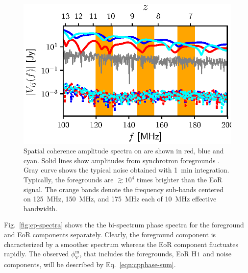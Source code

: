 \documentclass[
reprint,
superscriptaddress,
amsmath,
amssymb,
aps,
prd
]{revtex4-1}
\newcommand{\HI}{H\,{\sc i}}
\begin{document}
\begin{figure}[htb]
\includegraphics[width=\linewidth]{visamp_spectra_asm_eor_noise}
\caption{Spatial coherence amplitude spectra on  are shown in red, blue and cyan. Solid  lines show amplitudes from synchrotron foregrounds . Gray curve shows the typical noise obtained with 1~min integration.  Typically, the foregrounds are $\gtrsim 10^4$ times brighter than the EoR signal. The orange bands denote the frequency sub-bands centered on 125~MHz, 150~MHz, and 175~MHz each of 10~MHz effective bandwidth. \label{fig:vis-spectra}}
\end{figure}

Fig.~\ref{fig:cp-spectra} shows the the bi-spectrum phase spectra for the foreground and EoR components separately. Clearly, the foreground component is characterized by a smoother spectrum whereas the EoR component fluctuates rapidly. The observed $\phi_\nabla^\textrm{m}$, that includes the foregrounds, EoR \HI\, and noise components, will be described by Eq.~\ref{eqn:cpphase-sum}. 
\end{document}

